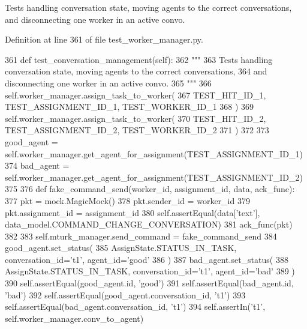 \begin{DoxyVerb}Tests handling conversation state, moving agents to the correct conversations,
and disconnecting one worker in an active convo.
\end{DoxyVerb}
 

Definition at line 361 of file test\+\_\+worker\+\_\+manager.\+py.


\begin{DoxyCode}
361     \textcolor{keyword}{def }test\_conversation\_management(self):
362         \textcolor{stringliteral}{"""}
363 \textcolor{stringliteral}{        Tests handling conversation state, moving agents to the correct conversations,}
364 \textcolor{stringliteral}{        and disconnecting one worker in an active convo.}
365 \textcolor{stringliteral}{        """}
366         self.worker\_manager.assign\_task\_to\_worker(
367             TEST\_HIT\_ID\_1, TEST\_ASSIGNMENT\_ID\_1, TEST\_WORKER\_ID\_1
368         )
369         self.worker\_manager.assign\_task\_to\_worker(
370             TEST\_HIT\_ID\_2, TEST\_ASSIGNMENT\_ID\_2, TEST\_WORKER\_ID\_2
371         )
372 
373         good\_agent = self.worker\_manager.get\_agent\_for\_assignment(TEST\_ASSIGNMENT\_ID\_1)
374         bad\_agent = self.worker\_manager.get\_agent\_for\_assignment(TEST\_ASSIGNMENT\_ID\_2)
375 
376         \textcolor{keyword}{def }fake\_command\_send(worker\_id, assignment\_id, data, ack\_func):
377             pkt = mock.MagicMock()
378             pkt.sender\_id = worker\_id
379             pkt.assignment\_id = assignment\_id
380             self.assertEqual(data[\textcolor{stringliteral}{'text'}], data\_model.COMMAND\_CHANGE\_CONVERSATION)
381             ack\_func(pkt)
382 
383         self.mturk\_manager.send\_command = fake\_command\_send
384         good\_agent.set\_status(
385             AssignState.STATUS\_IN\_TASK, conversation\_id=\textcolor{stringliteral}{'t1'}, agent\_id=\textcolor{stringliteral}{'good'}
386         )
387         bad\_agent.set\_status(
388             AssignState.STATUS\_IN\_TASK, conversation\_id=\textcolor{stringliteral}{'t1'}, agent\_id=\textcolor{stringliteral}{'bad'}
389         )
390         self.assertEqual(good\_agent.id, \textcolor{stringliteral}{'good'})
391         self.assertEqual(bad\_agent.id, \textcolor{stringliteral}{'bad'})
392         self.assertEqual(good\_agent.conversation\_id, \textcolor{stringliteral}{'t1'})
393         self.assertEqual(bad\_agent.conversation\_id, \textcolor{stringliteral}{'t1'})
394         self.assertIn(\textcolor{stringliteral}{'t1'}, self.worker\_manager.conv\_to\_agent)

\end{DoxyCode}
